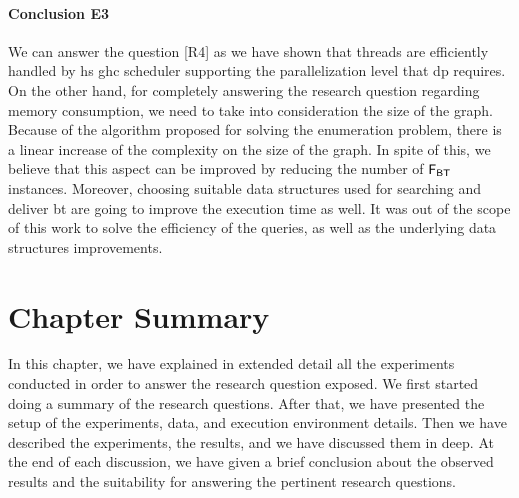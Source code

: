 \paragraph{Conclusion E3} We can answer the question [R4] as we have shown that threads are efficiently handled by \acrshort{hs} \acrshort{ghc} scheduler supporting the parallelization level that \acrshort{dp} requires. 
On the other hand, for completely answering the research question regarding memory consumption, we need to take into consideration the size of the graph.
Because of the algorithm proposed for solving the enumeration problem, there is a linear increase of the complexity on the size of the graph. In spite of this, we believe that this aspect can be improved by reducing the number of $\mathsf{F_{BT}}$ instances. Moreover, choosing suitable data structures used for searching and deliver \acrshort{bt} are going to improve the execution time as well. 
It was out of the scope of this work to solve the efficiency of the queries, as well as the underlying data structures improvements. 

\section{Chapter Summary}
In this chapter, we have explained in extended detail all the experiments conducted in order to answer the research question exposed.
We first started doing a summary of the research questions. After that, we have presented the setup of the experiments, data, and execution environment details.
Then we have described the experiments, the results, and we have discussed them in deep. At the end of each discussion, we have given a brief conclusion about the observed results and the suitability for answering the pertinent research questions.
